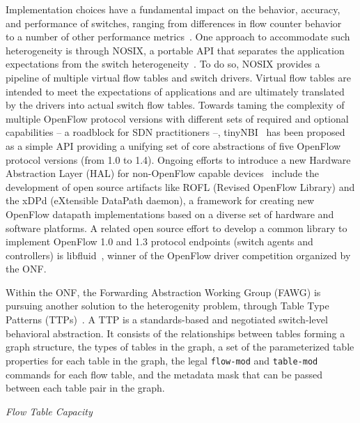 Implementation choices have a fundamental impact on the behavior, accuracy, and performance of switches, 
ranging from differences in flow counter behavior~\cite{curtis2011} to a number of 
other performance metrics~\cite{rotsos2012-1}. One approach to accommodate such heterogeneity 
is through NOSIX, a portable API that separates the application expectations from the switch heterogeneity~\cite{wundsam2012}. To do so, NOSIX provides a pipeline of multiple virtual flow 
tables and switch drivers. Virtual flow tables are intended to meet the expectations of applications and 
are ultimately translated by the drivers into actual switch flow tables. 
Towards taming the  complexity of multiple OpenFlow protocol versions with different sets of required and optional capabilities -- a roadblock for SDN practitioners --, tinyNBI~\cite{casey2014} has been proposed as a  simple API providing a unifying set of core abstractions of five OpenFlow protocol versions (from 1.0 to 1.4).
Ongoing efforts to introduce a new Hardware Abstraction Layer  (HAL) for non-OpenFlow capable devices~\cite{alienfp7}  include the development of open source artifacts like ROFL (Revised OpenFlow Library) and the xDPd (eXtensible DataPath daemon), a framework for creating new OpenFlow datapath implementations based on a diverse set of hardware and software platforms.
A related open source effort to develop a common library to implement OpenFlow 1.0 and 1.3 protocol endpoints (switch agents and controllers) is libfluid~\cite{libfluid}, winner of the OpenFlow driver competition organized by the ONF.

Within the ONF, the Forwarding Abstraction Working Group (FAWG) is pursuing another solution to the heterogenity problem, through Table Type Patterns 
(TTPs)~\cite{onf2013}. A TTP is a standards-based and negotiated switch-level behavioral abstraction. 
It consists of the relationships between tables forming a graph structure, the types of tables in the graph, 
a set of the parameterized table properties for each table in the graph, the legal \texttt{flow-mod} and \texttt{table-mod} commands for 
each flow table, and the metadata mask that can be passed between each table pair in the graph. 


\vspace{2mm}
\noindent \textit{Flow Table Capacity}

